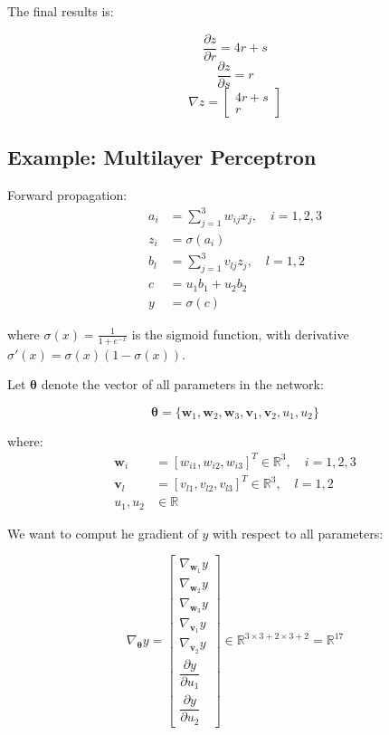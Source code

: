 \documentclass{tufte-handout}
\begin{document}
The final results is:

\[
\boxed{\frac{\partial z}{\partial r} = 4r + s}
\]
\[
\boxed{\frac{\partial z}{\partial s} = r}
\]
\[
\boxed{\nabla z = \begin{bmatrix} 4r + s \\ r \end{bmatrix}}
\]

\subsection{Example: Multilayer Perceptron}


Forward propagation:
\begin{align*}
a_i &= \sum_{j=1}^3 w_{ij}x_j, \quad i = 1,2,3 \\
z_i &= \sigma(a_i) \\
b_l &= \sum_{j=1}^3 v_{lj}z_j, \quad l = 1,2 \\
c &= u_1b_1 + u_2b_2 \\
y &= \sigma(c)
\end{align*}

where $\sigma(x) = \frac{1}{1+e^{-x}}$ is the sigmoid function, with derivative $\sigma'(x) = \sigma(x)(1-\sigma(x))$.


Let $\bm{\theta}$ denote the vector of all parameters in the network:

\[
\bm{\theta} = \{ \bm{w}_1, \bm{w}_2, \bm{w}_3, \bm{v}_1, \bm{v}_2, u_1, u_2 \}
\]

where:
\begin{align*}
\bm{w}_i &= [w_{i1}, w_{i2}, w_{i3}]^T \in \mathbb{R}^3, \quad i=1,2,3 \\
\bm{v}_l &= [v_{l1}, v_{l2}, v_{l3}]^T \in \mathbb{R}^3, \quad l=1,2 \\
u_1, u_2 &\in \mathbb{R}
\end{align*}



We want to comput he gradient of $y$ with respect to all parameters:

\[
\nabla_{\bm{\theta}} y = 
\begin{bmatrix}
\nabla_{\bm{w}_1} y \\
\nabla_{\bm{w}_2} y \\
\nabla_{\bm{w}_3} y \\
\nabla_{\bm{v}_1} y \\
\nabla_{\bm{v}_2} y \\
\dfrac{\partial y}{\partial u_1} \\
\dfrac{\partial y}{\partial u_2}
\end{bmatrix}
\in \mathbb{R}^{3 \times 3 + 2 \times 3 + 2} = \mathbb{R}^{17}
\]
\end{document}

